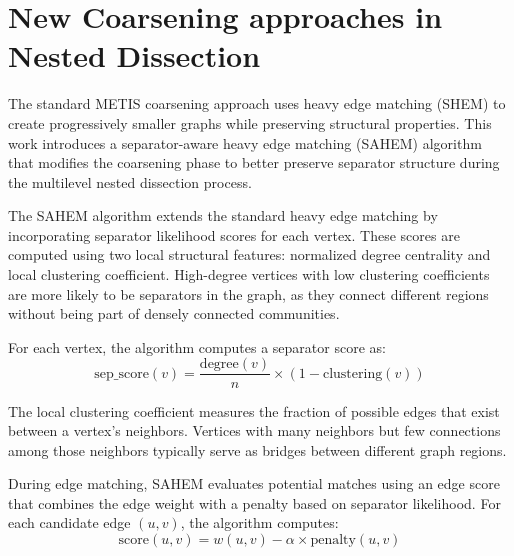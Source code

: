     



\section{New Coarsening approaches in Nested Dissection}

The standard METIS coarsening approach uses heavy edge matching (SHEM) to create progressively smaller graphs while preserving structural properties. This work introduces a separator-aware heavy edge matching (SAHEM) algorithm that modifies the coarsening phase to better preserve separator structure during the multilevel nested dissection process.

The SAHEM algorithm extends the standard heavy edge matching by incorporating separator likelihood scores for each vertex. These scores are computed using two local structural features: normalized degree centrality and local clustering coefficient. High-degree vertices with low clustering coefficients are more likely to be separators in the graph, as they connect different regions without being part of densely connected communities.

For each vertex, the algorithm computes a separator score as:
\[
\text{sep\_score}(v) = \frac{\text{degree}(v)}{n} \times (1 - \text{clustering}(v))
\]

The local clustering coefficient measures the fraction of possible edges that exist between a vertex's neighbors. Vertices with many neighbors but few connections among those neighbors typically serve as bridges between different graph regions.

During edge matching, SAHEM evaluates potential matches using an edge score that combines the edge weight with a penalty based on separator likelihood. For each candidate edge $(u,v)$, the algorithm computes:
\[
\text{score}(u,v) = w(u,v) - \alpha \times \text{penalty}(u,v)
\]


